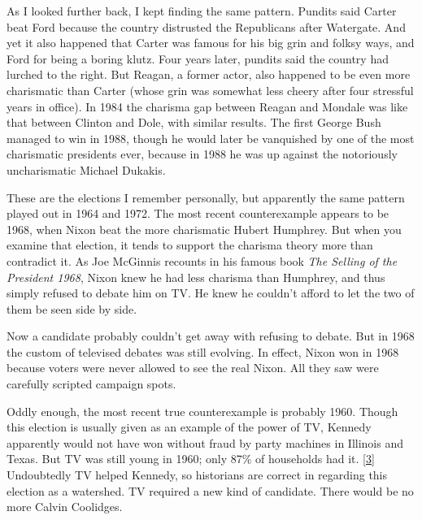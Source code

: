 As I
                  looked further back, I kept finding the same pattern. Pundits
                  said Carter beat Ford because the country distrusted the
                  Republicans after Watergate. And yet it also happened that
                  Carter was famous for his big grin and folksy ways, and Ford
                  for being a boring klutz. Four years later, pundits said the
                  country had lurched to the right. But Reagan, a former actor,
                  also happened to be even more charismatic than Carter (whose
                  grin was somewhat less cheery after four stressful years in
                  office). In 1984 the charisma gap between Reagan and Mondale
                  was like that between Clinton and Dole, with similar results.
                  The first George Bush managed to win in 1988, though he would
                  later be vanquished by one of the most charismatic presidents
                  ever, because in 1988 he was up against the notoriously
                  uncharismatic Michael Dukakis.

These are the
                  elections I remember personally, but apparently the same
                  pattern played out in 1964 and 1972. The most recent
                  counterexample appears to be 1968, when Nixon beat the more
                  charismatic Hubert Humphrey. But when you examine that
                  election, it tends to support the charisma theory more than
                  contradict it. As Joe McGinnis recounts in his famous book
                  \emph{The Selling of the President 1968}, Nixon knew he had
                  less charisma than Humphrey, and thus simply refused to debate
                  him on TV. He knew he couldn't afford to let the two of them
                  be seen side by side.

Now a candidate probably
                  couldn't get away with refusing to debate. But in 1968 the
                  custom of televised debates was still evolving. In effect,
                  Nixon won in 1968 because voters were never allowed to see the
                  real Nixon. All they saw were carefully scripted campaign
                  spots.

Oddly enough, the most recent true
                  counterexample is probably 1960. Though this election is
                  usually given as an example of the power of TV, Kennedy
                  apparently would not have won without fraud by party machines
                  in Illinois and Texas. But TV was still young in 1960; only
                  87\% of households had it.
                  [\href{\#f3n}{3}]
                  Undoubtedly TV helped Kennedy, so historians are correct in
                  regarding this election as a watershed. TV required a new kind
                  of candidate. There would be no more Calvin Coolidges.

